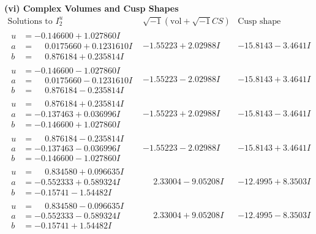 \documentclass[1p]{elsarticle_modified}
\theoremstyle{definition}
\newcommand{\I}{\sqrt{-1}}
\begin{document}
\newpage\flushleft \textbf{(vi) Complex Volumes and Cusp Shapes}
$$\begin{array}{c|c|c}  
\text{Solutions to }I^u_{2}& \I (\text{vol} + \sqrt{-1}CS) & \text{Cusp shape}\\
 \hline 
\begin{aligned}
u &= -0.146600 + 1.027860 I \\
a &= \phantom{-}0.0175660 + 0.1231610 I \\
b &= \phantom{-}0.876184 + 0.235814 I\end{aligned}
 & -1.55223 + 2.02988 I & -15.8143 - 3.4641 I \\ \hline\begin{aligned}
u &= -0.146600 - 1.027860 I \\
a &= \phantom{-}0.0175660 - 0.1231610 I \\
b &= \phantom{-}0.876184 - 0.235814 I\end{aligned}
 & -1.55223 - 2.02988 I & -15.8143 + 3.4641 I \\ \hline\begin{aligned}
u &= \phantom{-}0.876184 + 0.235814 I \\
a &= -0.137463 + 0.036996 I \\
b &= -0.146600 + 1.027860 I\end{aligned}
 & -1.55223 + 2.02988 I & -15.8143 - 3.4641 I \\ \hline\begin{aligned}
u &= \phantom{-}0.876184 - 0.235814 I \\
a &= -0.137463 - 0.036996 I \\
b &= -0.146600 - 1.027860 I\end{aligned}
 & -1.55223 - 2.02988 I & -15.8143 + 3.4641 I \\ \hline\begin{aligned}
u &= \phantom{-}0.834580 + 0.096635 I \\
a &= -0.552333 + 0.589324 I \\
b &= -0.15741 - 1.54482 I\end{aligned}
 & \phantom{-}2.33004 - 9.05208 I & -12.4995 + 8.3503 I \\ \hline\begin{aligned}
u &= \phantom{-}0.834580 - 0.096635 I \\
a &= -0.552333 - 0.589324 I \\
b &= -0.15741 + 1.54482 I\end{aligned}
 & \phantom{-}2.33004 + 9.05208 I & -12.4995 - 8.3503 I \\ \hline\begin{aligned}

\end{aligned}
\end{array}$$
\end{document}
